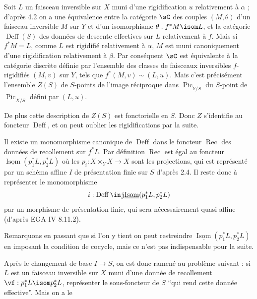 Soit $L$ un faisceau inversible sur $X$ muni d'une rigidification $u$ relativement à $\alpha$ ; d'après 4.2 on a une équivalence entre la catégorie $\sC$ des couples $(M, \theta)$ d'un faisceau inversible $M$ sur $Y$ et d'un isomorphisme $\theta : f^*M \isom L$, et la catégorie $\operatorname{Deff}(S)$ des données de descente effectives sur $L$ relativement à $f$. Mais si $f^*M = L$, comme $L$ est rigidifié relativement à $\alpha$, $M$ est muni canoniquement d'une rigidification relativement à $\beta$. Par conséquent $\sC$ est équivalente à la catégorie discrète définie par l'ensemble des classes de faisceaux inversibles $f$-rigidifiés $(M,v)$ sur $Y$, tels que $f^*(M,v) \sim (L,u)$. Mais c'est précisément l'ensemble $Z(S)$ de $S$-points de l'image réciproque dans $\underline{\operatorname{Pic}}_{Y/S}$ du $S$-point de $\underline{\operatorname{Pic}}_{X/S}$ défini par $(L,u)$.

De plus cette description de $Z(S)$ est fonctorielle en $S$. Donc $Z$ s'identifie au foncteur $\operatorname{Deff}$, et on peut oublier les rigidifications par la suite.

\noindent
Il existe un monomorphisme canonique de $\operatorname{Deff}$ dans le foncteur $\operatorname{Rec}$ des données de recollement sur $f^*L$. Par définition $\operatorname{Rec}$ est égal au foncteur $\underline{\operatorname{Isom}}(p_1^*L, p_2^*L)$ où les $p_i : X \times_Y X \to X$ sont les projections, qui est représenté par un schéma affine $I$ de présentation finie sur $S$ d'après 2.4. Il reste donc à représenter le monomorphisme
\[
i : \operatorname{Deff} \inj \underline{\operatorname{Isom}}(p_1^*L, p_2^*L)
\]
par un morphisme de présentation finie, qui sera nécessairement quasi-affine (d'après EGA IV 8.11.2).

Remarquons en passant que si l'on y tient on peut restreindre $\underline{\operatorname{Isom}}(p_1^*L, p_2^*L)$ en imposant la condition de cocycle, mais ce n'est pas indispensable pour la suite.

Après le changement de base $I \to S$, on est donc ramené au problème suivant : si $L$ est un faisceau inversible sur $X$ muni d'une donnée de recollement $\vf : p_1^*L \isom p_2^*L$, représenter le sous-foncteur de $S$ ``qui rend cette donnée effective''. Mais on a le

